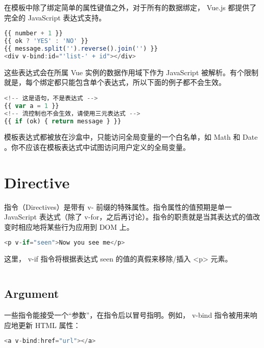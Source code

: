 在模板中除了绑定简单的属性键值之外，对于所有的数据绑定， Vue.js 都提供了完全的 JavaScript 表达式支持。

\begin{lstlisting}[language=JavaScript]
{{ number + 1 }}
{{ ok ? 'YES' : 'NO' }}
{{ message.split('').reverse().join('') }}
<div v-bind:id="'list-' + id"></div>
\end{lstlisting}


这些表达式会在所属 Vue 实例的数据作用域下作为 JavaScript 被解析。有个限制就是，每个绑定都只能包含单个表达式，所以下面的例子都不会生效。

\begin{lstlisting}[language=JavaScript]
<!-- 这是语句，不是表达式 -->
{{ var a = 1 }}
<!-- 流控制也不会生效，请使用三元表达式 -->
{{ if (ok) { return message } }}
\end{lstlisting}


模板表达式都被放在沙盒中，只能访问全局变量的一个白名单，如 Math 和 Date 。你不应该在模板表达式中试图访问用户定义的全局变量。




\section{Directive}

指令（Directives）是带有 v- 前缀的特殊属性。指令属性的值预期是单一 JavaScript 表达式（除了 v-for，之后再讨论）。指令的职责就是当其表达式的值改变时相应地将某些行为应用到 DOM 上。

\begin{lstlisting}[language=JavaScript]
<p v-if="seen">Now you see me</p>
\end{lstlisting}

这里， v-if 指令将根据表达式 seen 的值的真假来移除/插入 <p> 元素。


\begin{lstlisting}[language=JavaScript]

\end{lstlisting}




\subsection{Argument}

一些指令能接受一个“参数”，在指令后以冒号指明。例如， v-bind 指令被用来响应地更新 HTML 属性：

\begin{lstlisting}[language=JavaScript]
<a v-bind:href="url"></a>
\end{lstlisting}


